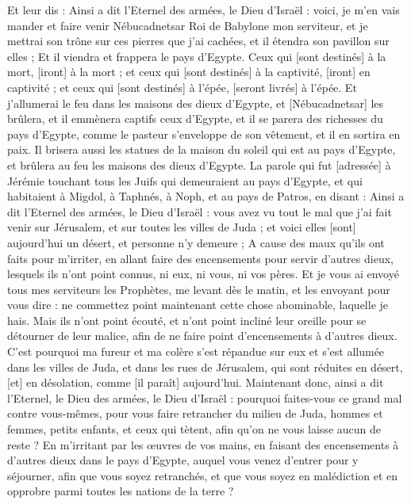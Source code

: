 \begin{multicols}{2}
Et leur dis : Ainsi a dit l'Eternel des armées, le Dieu d'Israël : voici, je m'en vais mander et faire venir Nébucadnetsar Roi de Babylone mon serviteur, et je mettrai son trône sur ces pierres que j'ai cachées, et il étendra son pavillon sur elles ;
Et il viendra et frappera le pays d'Egypte. Ceux qui [sont destinés] à la mort, [iront] à la mort ; et ceux qui [sont destinés] à la captivité, [iront] en captivité ; et ceux qui [sont destinés] à l'épée, [seront livrés] à l'épée.
Et j'allumerai le feu dans les maisons des dieux d'Egypte, et [Nébucadnetsar] les brûlera, et il emmènera captifs ceux d'Egypte, et il se parera des richesses du pays d'Egypte, comme le pasteur s'enveloppe de son vêtement, et il en sortira en paix.
Il brisera aussi les statues de la maison du soleil qui est au pays d'Egypte, et brûlera au feu les maisons des dieux d'Egypte.
\VerseOne{}La parole qui fut [adressée] à Jérémie touchant tous les Juifs qui demeuraient au pays d'Egypte, et qui habitaient à Migdol, à Taphnés, à Noph, et au pays de Patros, en disant :
Ainsi a dit l'Eternel des armées, le Dieu d'Israël : vous avez vu tout le mal que j'ai fait venir sur Jérusalem, et sur toutes les villes de Juda ; et voici elles [sont] aujourd'hui un désert, et personne n'y demeure ;
A cause des maux qu'ils ont faits pour m'irriter, en allant faire des encensements pour servir d'autres dieux, lesquels ils n'ont point connus, ni eux, ni vous, ni vos pères.
Et je vous ai envoyé tous mes serviteurs les Prophètes, me levant dès le matin, et les envoyant pour vous dire : ne commettez point maintenant cette chose abominable, laquelle je hais.
Mais ils n'ont point écouté, et n'ont point incliné leur oreille pour se détourner de leur malice, afin de ne faire point d'encensements à d'autres dieux.
C'est pourquoi ma fureur et ma colère s'est répandue sur eux et s'est allumée dans les villes de Juda, et dans les rues de Jérusalem, qui sont réduites en désert, [et] en désolation, comme [il paraît] aujourd'hui.
Maintenant donc, ainsi a dit l'Eternel, le Dieu des armées, le Dieu d'Israël : pourquoi faites-vous ce grand mal contre vous-mêmes, pour vous faire retrancher du milieu de Juda, hommes et femmes, petits enfants, et ceux qui tètent, afin qu'on ne vous laisse aucun de reste ?
En m'irritant par les œuvres de vos mains, en faisant des encensements à d'autres dieux dans le pays d'Egypte, auquel vous venez d'entrer pour y séjourner, afin que vous soyez retranchés, et que vous soyez en malédiction et en opprobre parmi toutes les nations de la terre ?

\end{multicols}
